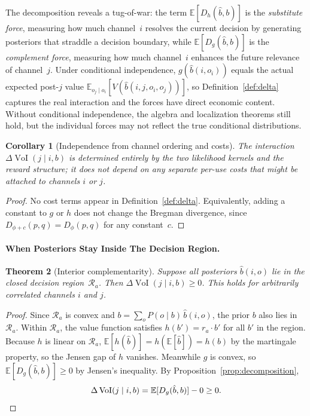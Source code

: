 \documentclass{article}
\newcommand{\VoI}{\operatorname{VoI}}
\newcommand{\bpost}{\hat{b}}
\newcommand{\E}{\mathbb{E}}
\newcommand{\Dg}{D_g}
\newcommand{\Dh}{D_h}
\newtheorem{theorem}{Theorem}
\newtheorem{corollary}[theorem]{Corollary}
\begin{document}
The decomposition reveals a tug-of-war: the term $\E[\Dh(\bpost, b)]$ is the \emph{substitute force}, measuring how much channel~$i$ resolves the current decision by generating posteriors that straddle a decision boundary, while $\E[\Dg(\bpost, b)]$ is the \emph{complement force}, measuring how much channel~$i$ enhances the future relevance of channel~$j$.
Under conditional independence, $g(\bpost(i, o_i))$ equals the actual expected post-$j$ value $\E_{o_j \mid o_i}[V(\bpost(i,j,o_i,o_j))]$, so Definition~\ref{def:delta} captures the real interaction and the forces have direct economic content. Without conditional independence, the algebra and localization theorems still hold, but the individual forces may not reflect the true conditional distributions.

\begin{corollary}[Independence from channel ordering and costs]
\label{cor:cost}
The interaction $\Delta\VoI(j \mid i, b)$ is determined entirely by the two likelihood kernels and the reward structure; it does not depend on any separate per-use costs that might be attached to channels $i$ or $j$.
\end{corollary}

\begin{proof}
No cost terms appear in Definition~\ref{def:delta}.
Equivalently, adding a constant to $g$ or $h$ does not change the Bregman divergence, since $D_{\phi+c}(p,q) = D_\phi(p,q)$ for any constant~$c$.
\end{proof}

\paragraph{When Posteriors Stay Inside The Decision Region.}

\begin{theorem}[Interior complementarity]
\label{thm:interior}
Suppose all posteriors $\bpost(i, o)$ lie in the closed decision region~$\mathcal{R}_a$.
Then $\Delta\VoI(j \mid i, b) \geq 0$.
This holds for arbitrarily correlated channels $i$ and $j$.
\end{theorem}

\begin{proof}
Since $\mathcal{R}_a$ is convex and $b = \sum_o P(o \mid b)\, \bpost(i, o)$, the prior $b$ also lies in $\mathcal{R}_a$.
Within $\mathcal{R}_a$, the value function satisfies $h(b') = r_a \cdot b'$ for all $b'$ in the region.
Because $h$ is linear on $\mathcal{R}_a$, $\E[h(\bpost)] = h(\E[\bpost]) = h(b)$ by the martingale property, so the Jensen gap of $h$ vanishes.
Meanwhile $g$ is convex, so $\E[\Dg(\bpost, b)] \geq 0$ by Jensen's inequality.
By Proposition~\ref{prop:decomposition},
\[
  \Delta\VoI(j \mid i, b) = \E[\Dg(\bpost, b)] - 0 \geq 0. \qedhere
\]
\end{proof}
\end{document}
